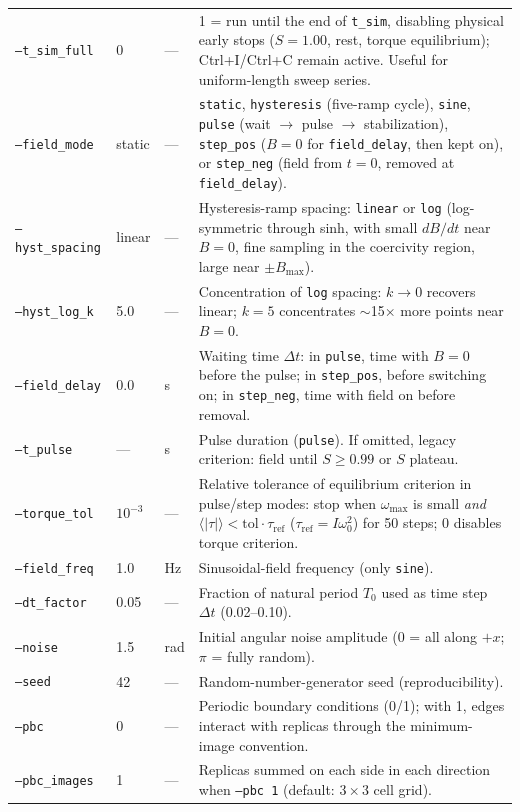 \documentclass[11pt,a4paper]{article}
\newcommand{\code}[1]{\texttt{#1}}
\begin{document}
\begin{longtable}{@{}lll p{7.6cm}@{}}
\code{--t\_sim\_full} & 0 & --- & 1 = run until the end of \code{t\_sim}, disabling physical early stops ($S{=}1.00$, rest, torque equilibrium); Ctrl+I/Ctrl+C remain active. Useful for uniform-length sweep series. \\
\code{--field\_mode} & static & --- & \code{static}, \code{hysteresis} (five-ramp cycle), \code{sine}, \code{pulse} (wait $\to$ pulse $\to$ stabilization), \code{step\_pos} ($B{=}0$ for \code{field\_delay}, then kept on), or \code{step\_neg} (field from $t{=}0$, removed at \code{field\_delay}). \\
\code{--hyst\_spacing} & linear & --- & Hysteresis-ramp spacing: \code{linear} or \code{log} (log-symmetric through sinh, with small $dB/dt$ near $B{=}0$, fine sampling in the coercivity region, large near $\pm B_{\max}$). \\
\code{--hyst\_log\_k} & 5.0 & --- & Concentration of \code{log} spacing: $k \to 0$ recovers linear; $k{=}5$ concentrates $\sim$15$\times$ more points near $B{=}0$. \\
\code{--field\_delay} & 0.0 & s & Waiting time $\Delta t$: in \code{pulse}, time with $B{=}0$ before the pulse; in \code{step\_pos}, before switching on; in \code{step\_neg}, time with field on before removal. \\
\code{--t\_pulse} & --- & s & Pulse duration (\code{pulse}). If omitted, legacy criterion: field until $S \geq 0.99$ or $S$ plateau. \\
\code{--torque\_tol} & $10^{-3}$ & --- & Relative tolerance of equilibrium criterion in pulse/step modes: stop when $\omega_{\max}$ is small \emph{and} $\langle|\tau|\rangle < \mathrm{tol}\cdot\tau_{\mathrm{ref}}$ ($\tau_{\mathrm{ref}} = I\omega_0^2$) for 50 steps; 0 disables torque criterion. \\
\code{--field\_freq} & 1.0 & Hz & Sinusoidal-field frequency (only \code{sine}). \\
\code{--dt\_factor} & 0.05 & --- & Fraction of natural period $T_0$ used as time step $\Delta t$ (0.02--0.10). \\
\code{--noise} & 1.5 & rad & Initial angular noise amplitude ($0$ = all along $+x$; $\pi$ = fully random). \\
\code{--seed} & 42 & --- & Random-number-generator seed (reproducibility). \\
\code{--pbc} & 0 & --- & Periodic boundary conditions (0/1); with 1, edges interact with replicas through the minimum-image convention. \\
\code{--pbc\_images} & 1 & --- & Replicas summed on each side in each direction when \code{--pbc 1} (default: $3\times3$ cell grid). \\

\end{longtable}
\end{document}
